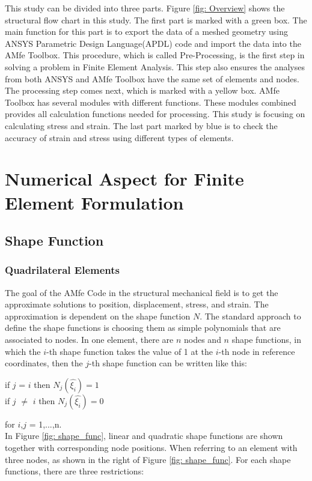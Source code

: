 This study can be divided into three parts.  Figure \ref{fig: Overview} shows the structural flow chart in this study. The first part is marked with a green box. The main function for this part is to export the data of a meshed geometry using ANSYS Parametric Design Language(APDL) code and import the data into the AMfe Toolbox. This procedure, which is called Pre-Processing, is the first step in solving a problem in Finite Element Analysis. This step also ensures the analyses from both ANSYS and AMfe Toolbox have the same set of elements and nodes. The processing step comes next, which is marked with a yellow box. AMfe Toolbox has several modules with different functions. These modules combined provides all calculation functions needed for processing. This study is focusing on calculating stress and strain. The last part marked by blue is to check the accuracy of strain and stress using different types of elements.

\chapter{Numerical Aspect for Finite Element Formulation}
\section{Shape Function}
\subsection{Quadrilateral Elements}
The goal of the AMfe Code in the structural mechanical field is to get the approximate solutions to position, displacement, stress, and strain. The approximation is dependent on the shape function $N$. The standard approach to define the shape functions is choosing them as simple polynomials that are associated to nodes. In one element, there are $n$ nodes and $n$ shape functions, in which the $i$-th shape function takes the value of 1 at the $i$-th node in reference coordinates, then the $j$-th shape function can be written like this: \\

\begin{center}
	if $j$ = $i$ then $N_j\left(\hat{\xi_i}\right) = 1$ \\
	if $j$ $\neq$ $i$ then $N_j\left(\hat{\xi_i}\right) = 0$
\end{center}



for $i$,$j$ = 1,...,n. \\
In Figure \ref{fig: shape_func}, linear and quadratic shape functions are shown together with corresponding node positions. When referring to an element with three nodes, as shown in the right of Figure \ref{fig: shape_func}. For each shape functions, there are three restrictions:

